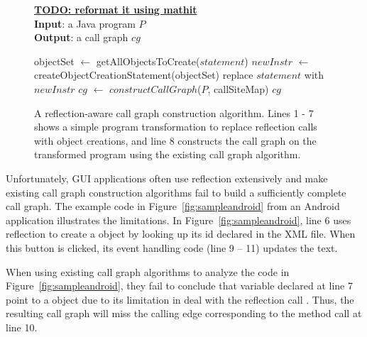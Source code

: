 

\begin{figure}[t]
\textbf{\underline{TODO: reformat it using mathit}}\\
\textbf{Input}: a Java program $P$\\
\textbf{Output}: a call graph $cg$\\
\vspace{-5mm}
\begin{algorithmic}[1]
\STATE objectSet $\leftarrow$ getAllObjectsToCreate($statement$)
\STATE $newInstr$ $\leftarrow$ createObjectCreationStatement(objectSet)
\STATE replace $statement$ with $newInstr$
\ENDIF
\ENDFOR
\STATE $cg$ $\leftarrow$ $constructCallGraph$($P$, callSiteMap)
\RETURN $cg$
\vspace{-2mm}
\end{algorithmic}
\label{fig:cgalgorithm}
\caption{A reflection-aware call graph construction algorithm. Lines 1
- 7 shows a simple program transformation to replace reflection calls
with object creations, and line 8 constructs the call graph on
the transformed program using the existing call graph algorithm. 
} 
\end{figure}

Unfortunately, GUI applications often use reflection extensively and make
existing call graph construction algorithms fail to build a sufficiently complete
call graph. The example code in Figure~\ref{fig:sampleandroid} from an Android application
 illustrates the limitations.
In Figure~\ref{fig:sampleandroid}, line 6 uses reflection to create a 
object by looking up its id declared in the XML file. When this button
is clicked, its event handling code (line 9 -- 11) updates the text.

When using existing call graph algorithms to analyze the code in Figure~\ref{fig:sampleandroid},
they fail to conclude that variable  declared at line 7
point to a  object due to its limitation in deal with the
reflection call . Thus, the resulting
call graph will miss the calling edge corresponding to the method
call  at line 10. 


